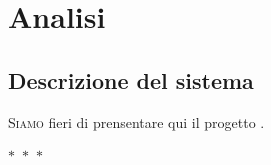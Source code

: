 \chapter{Analisi}
\section{Descrizione del sistema} 
\lettrine{S}{iamo} fieri di prensentare qui il progetto \textbf{\ProjectTitle}. \lipsum[2]

\begin{center}
	$\ast$~$\ast$~$\ast$
\end{center}

\lipsum